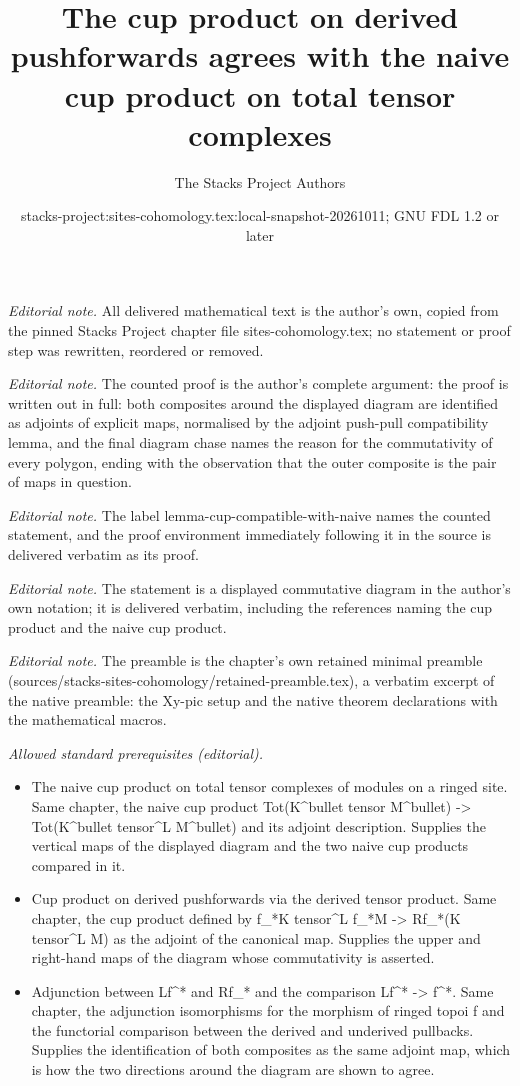 \documentclass[10pt,a4paper]{amsart}
\title{The cup product on derived pushforwards agrees with the naive cup product on total tensor complexes}
\author{The Stacks Project Authors}
\date{stacks-project:sites-cohomology.tex:local-snapshot-20261011; GNU FDL 1.2 or later}
\theoremstyle{plain}
\theoremstyle{definition}
\theoremstyle{remark}
\numberwithin{equation}{subsection}
\begin{document}
\maketitle
\noindent\textit{Editorial note.} All delivered mathematical text is the author's own, copied from the pinned Stacks Project chapter file sites-cohomology.tex; no statement or proof step was rewritten, reordered or removed.\par\medskip
\noindent\textit{Editorial note.} The counted proof is the author's complete argument: the proof is written out in full: both composites around the displayed diagram are identified as adjoints of explicit maps, normalised by the adjoint push-pull compatibility lemma, and the final diagram chase names the reason for the commutativity of every polygon, ending with the observation that the outer composite is the pair of maps in question.\par\medskip
\noindent\textit{Editorial note.} The label lemma-cup-compatible-with-naive names the counted statement, and the proof environment immediately following it in the source is delivered verbatim as its proof.\par\medskip
\noindent\textit{Editorial note.} The statement is a displayed commutative diagram in the author's own notation; it is delivered verbatim, including the references naming the cup product and the naive cup product.\par\medskip
\noindent\textit{Editorial note.} The preamble is the chapter's own retained minimal preamble (sources/stacks-sites-cohomology/retained-preamble.tex), a verbatim excerpt of the native preamble: the Xy-pic setup and the native theorem declarations with the mathematical macros.\par\medskip
\noindent\textit{Allowed standard prerequisites (editorial).}\begin{itemize}
\item The naive cup product on total tensor complexes of modules on a ringed site. Same chapter, the naive cup product Tot(K\textasciicircum{}bullet tensor M\textasciicircum{}bullet) -> Tot(K\textasciicircum{}bullet tensor\textasciicircum{}L M\textasciicircum{}bullet) and its adjoint description. Supplies the vertical maps of the displayed diagram and the two naive cup products compared in it.
\item Cup product on derived pushforwards via the derived tensor product. Same chapter, the cup product defined by f\_*K tensor\textasciicircum{}L f\_*M -> Rf\_*(K tensor\textasciicircum{}L M) as the adjoint of the canonical map. Supplies the upper and right-hand maps of the diagram whose commutativity is asserted.
\item Adjunction between Lf\textasciicircum{}* and Rf\_* and the comparison Lf\textasciicircum{}* -> f\textasciicircum{}*. Same chapter, the adjunction isomorphisms for the morphism of ringed topoi f and the functorial comparison between the derived and underived pullbacks. Supplies the identification of both composites as the same adjoint map, which is how the two directions around the diagram are shown to agree.
\end{itemize}\medskip
\end{document}
